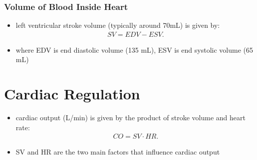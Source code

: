 \documentclass[10pt]{article}
\begin{document}
\subsubsection{Volume of Blood Inside Heart}
\begin{itemize}
    \item left ventricular stroke volume (typically around 70mL) is given by:
        \begin{gather*}
            SV = EDV - ESV
        .\end{gather*}
    \item where EDV is end diastolic volume (135 mL), ESV is end systolic volume (65 mL)
\end{itemize}



\section{Cardiac Regulation}
\begin{itemize}
    \item cardiac output (L/min) is given by the product of stroke volume and heart rate:
        \begin{gather*}
            CO = SV \cdot HR
        .\end{gather*}
    \item SV and HR are the two main factors that influence cardiac output
\end{itemize}
\end{document}
